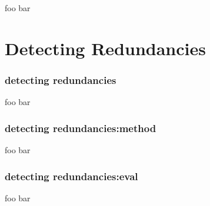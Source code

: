 \documentclass[table]{beamer}
\begin{document}
\begin{frame}
 foo bar
\end{frame}

\section{Detecting Redundancies}
\begin{frame}
  \frametitle{detecting redundancies}
  foo bar
\end{frame}

\begin{frame}
  \frametitle{detecting redundancies:method}
  foo bar
\end{frame}

\begin{frame}
  \frametitle{detecting redundancies:eval}
  foo bar
\end{frame}



\end{document}
